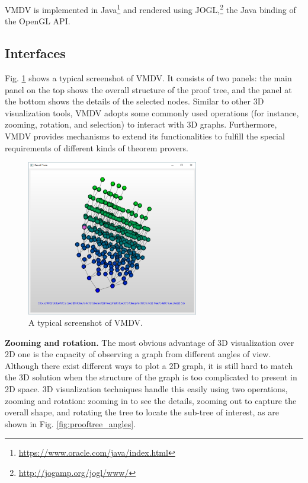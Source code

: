 \documentclass[runningheads]{llncs}
\newcommand\tool[1]{\textsf{#1}}
\newcommand\vmdv{\tool{VMDV}}
\begin{document}
\vmdv{} is implemented in Java\footnote{\url{https://www.oracle.com/java/index.html}} and rendered using \textsf{JOGL},\footnote{\url{http://jogamp.org/jogl/www/}} the Java binding of the \textsf{OpenGL} \textsf{API}.
 
\subsection{Interfaces}
Fig. \ref{fig:screenshot} shows a typical screenshot of \textsf{VMDV}. It consists of two panels: the main panel on the top shows the overall structure of the proof tree, and the panel at the bottom shows the details of the selected nodes.
Similar to other 3D visualization tools, \vmdv{} adopts some commonly used operations (for instance, zooming, rotation, and selection) to interact with 3D graphs. Furthermore, \vmdv{} provides mechanisms to extend its functionalities to fulfill the special requirements of different kinds of theorem provers.
\begin{figure}[h]
\centering
\includegraphics[width=7.5cm]{./050407.png}
\caption{A typical screenshot of \textsf{VMDV}.}
\label{fig:screenshot}
\end{figure}
\smallskip

\hspace{-0.5cm}
{\bf Zooming and rotation.}
The most obvious advantage of 3D visualization over 2D one is the capacity of observing a graph from different angles of view. Although there exist different ways to plot a 2D graph, it is still hard to match the 3D solution when the structure of the graph is too complicated to present in 2D space. 3D visualization techniques handle this easily using two operations, zooming and rotation: zooming in to see the details, zooming out to capture the overall shape, and rotating the tree to locate the sub-tree of interest, as are shown in Fig. \ref{fig:prooftree_angles}.
 
\end{document}
